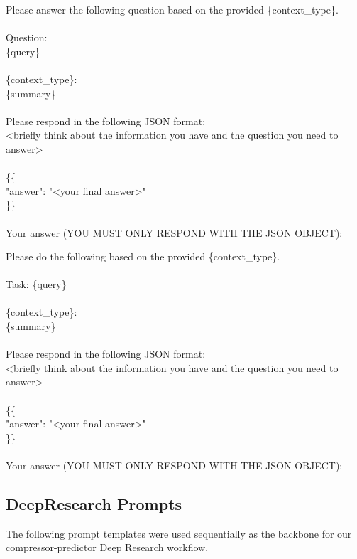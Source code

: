 \documentclass{article} %
\newcommand{\tab}{\hspace*{2em}}
\begin{document}
\begin{examplebox}
    \ttfamily
Please answer the following question based on the provided \{context\_type\}.\\
\\
Question:\\
\{query\}\\
\\
\{context\_type\}:\\
\{summary\}\\
\\
Please respond in the following JSON format:\\
<briefly think about the information you have and the question you need to answer>\\
\\
\{\{\\
\tab "answer": "<your final answer>" \\
\}\} \\
\\
Your answer (YOU MUST ONLY RESPOND WITH THE JSON OBJECT):
\end{examplebox}

\begin{examplebox}
    \ttfamily
Please do the following based on the provided \{context\_type\}.\\
\\
Task:
\{query\}\\
\\
\{context\_type\}:\\
\{summary\}\\
\\
Please respond in the following JSON format:\\
<briefly think about the information you have and the question you need to answer>\\
\\
\{\{\\
\tab "answer": "<your final answer>"\\
\}\}\\
\\
Your answer (YOU MUST ONLY RESPOND WITH THE JSON OBJECT):
\end{examplebox}

\subsection{DeepResearch Prompts}
\label{ref:appendix-deepresearch-prompts}
The following prompt templates were used sequentially as the backbone for our compressor-predictor Deep Research workflow. 
\end{document}
